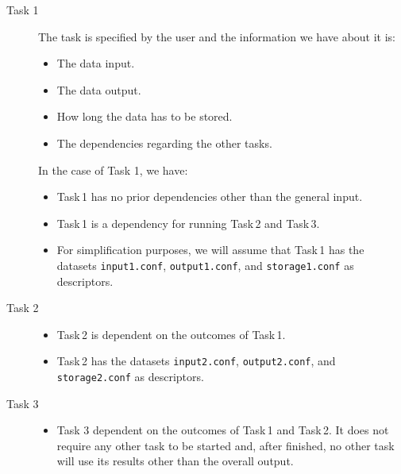 \documentclass[a4paper]{article}
\begin{document}
{{{{\begin{description}
\item[Task 1] The task is specified by the user and the information we have about it is:

\begin{itemize}

\item The data input.

\item The data output.

\item How long the data has to be stored.

\item The dependencies regarding the other tasks.

\end{itemize}

In the case of Task 1, we have:

\begin{itemize}

\item Task\,1 has no prior dependencies other than the general input.

\item Task\,1 is a dependency for running Task\,2 and Task\,3.

\item For simplification purposes, we will assume that Task\,1 has the datasets \texttt{input1.conf}, \texttt{output1.conf}, and \texttt{storage1.conf} as descriptors.

\end{itemize}

\item[Task 2]

\begin{itemize}

\item Task\,2 is dependent on the outcomes of Task\,1.

\item Task\,2 has the datasets \texttt{input2.conf}, \texttt{output2.conf}, and \texttt{storage2.conf} as descriptors.

\end{itemize}

\item[Task 3]

\begin{itemize}

\item Task 3 dependent on the outcomes of Task\,1 and Task\,2. It does not require any other task to be started and, after finished, no other task will use its results other than the overall output.


\end{itemize}
\end{description}}}}}
\end{document}
